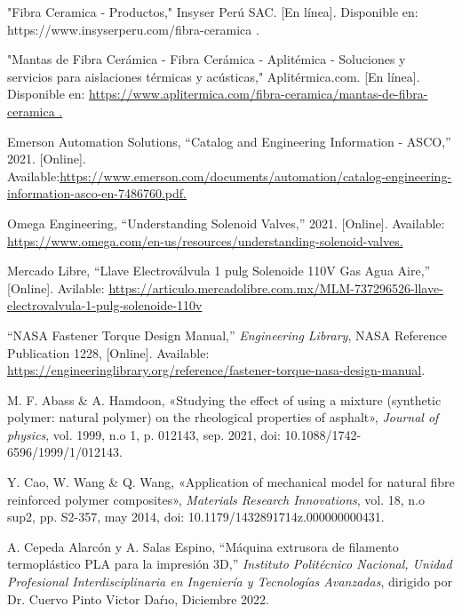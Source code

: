 \documentclass[14pt,oneside]{extarticle} %
\begin{document}
\begin{thebibliography}{5}
    "Fibra Ceramica - Productos," Insyser Perú SAC. [En línea]. Disponible en: https://www.insyserperu.com/fibra-ceramica . 
    
    "Mantas de Fibra Cerámica - Fibra Cerámica - Aplitémica - Soluciones y servicios para aislaciones térmicas y acústicas," Aplitérmica.com. [En línea]. Disponible en: \url{https://www.aplitermica.com/fibra-ceramica/mantas-de-fibra-ceramica . }
    
    Emerson Automation Solutions, ``Catalog and Engineering Information - ASCO,'' 2021. [Online]. Available:\url{https://www.emerson.com/documents/automation/catalog-engineering-information-asco-en-7486760.pdf.}
        
    Omega Engineering, ``Understanding Solenoid Valves,'' 2021. [Online]. Available: \url{https://www.omega.com/en-us/resources/understanding-solenoid-valves.}
       
    Mercado Libre, ``Llave Electroválvula 1 pulg Solenoide 110V Gas Agua Aire,'' [Online].  Avilable: \url{https://articulo.mercadolibre.com.mx/MLM-737296526-llave-electrovalvula-1-pulg-solenoide-110v}

    ``NASA Fastener Torque Design Manual,'' \emph{Engineering Library}, NASA Reference Publication 1228, [Online]. Available: \url{https://engineeringlibrary.org/reference/fastener-torque-nasa-design-manual}.

     M. F. Abass \& A. Hamdoon, «Studying the effect of using a mixture (synthetic polymer: natural polymer) on the rheological properties of asphalt», \textit{Journal of physics}, vol. 1999, n.o 1, p. 012143, sep. 2021, doi: 10.1088/1742-6596/1999/1/012143.
    
    Y. Cao, W. Wang \& Q. Wang, «Application of mechanical model for natural fibre reinforced polymer composites», \textit{Materials Research Innovations}, vol. 18, n.o sup2, pp. S2-357, may 2014, doi: 10.1179/1432891714z.000000000431.

    A. Cepeda Alarcón y A. Salas Espino, ``Máquina extrusora de filamento termoplástico PLA para la impresión 3D,'' \textit{Instituto Politécnico Nacional, Unidad Profesional Interdisciplinaria en Ingeniería y Tecnologías Avanzadas}, dirigido por Dr. Cuervo Pinto Victor Daŕıo, Diciembre 2022.

\end{thebibliography}
\end{document}
